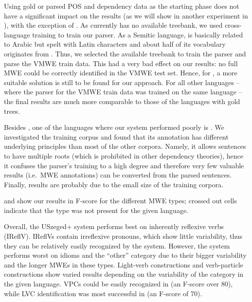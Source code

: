 \documentclass[output=paper,
modfonts,
]{langscibook}
\begin{document}
Using gold or parsed POS and dependency data as the starting phase does not have a significant impact on the results (as we will show in another experiment in ), with the exception of . As  currently has no available  treebank, we used cross-language training to train our parser. As a Semitic language,  is basically related to Arabic but spelt with Latin characters and about half of its vocabulary originates from . Thus, we selected the available   treebank to train the parser and parse the VMWE train data. This had a very bad effect on our results: no full MWE could be correctly identified in the VMWE test set. Hence, for , a more suitable solution is still to be found for our approach. For all other languages -- where the parser for the VMWE train data was trained on the same language -- the final results are much more comparable to those of the languages with gold trees.

Besides , one of the languages where our system performed poorly is . We investigated the  training corpus and found that its annotation has different underlying principles than most of the other corpora. Namely, it allows sentences to have multiple roots (which is prohibited in other dependency theories), hence it confuses the parser's training to a high degree and therefore very few valuable results (i.e.~MWE annotations) can be converted from the parsed sentences. Finally,  results are probably due to the small size of the training corpora.

 and  show our results in F-score for the different MWE types; crossed out cells indicate that the type was not present for the given language. 

Overall, the USzeged+ system performs best on inherently reflexive verbs (IReflV). IReflVs contain irreflexive pronouns, which show little variability, thus they can be relatively easily recognized by the system. However, the system performs worst on idioms and the ``other'' category due to their bigger variability and the longer MWEs in these types. Light-verb constructions and verb-particle constructions show varied results depending on the variability of the category in the given language. VPCs could be easily recognized in  (an F-score over 80), while LVC identification was most successful in  (an F-score of 70).
\end{document}
